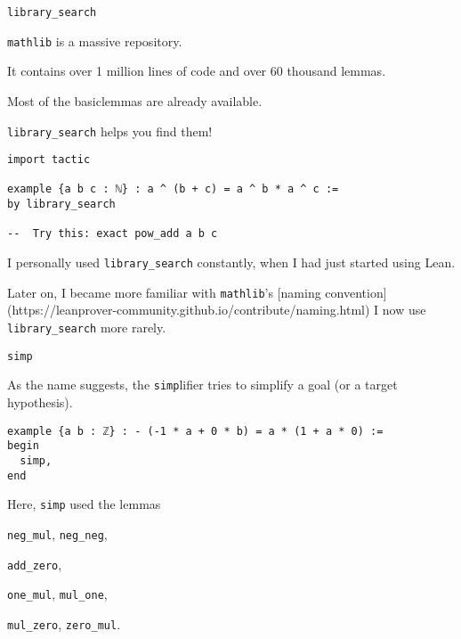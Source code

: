 \documentclass{beamer}
\begin{document}
\begin{frame}[fragile]{{\texttt{library\_search}}}

{\verb`mathlib`} is a massive repository.

It contains over 1 million lines of code and over 60 thousand lemmas.

Most of the basic\footnotemark lemmas are already available.

{\verb`library_search`} helps you find them!

\begin{verbatim}
import tactic

example {a b c : ℕ} : a ^ (b + c) = a ^ b * a ^ c :=
by library_search

--  Try this: exact pow_add a b c
\end{verbatim}

\end{frame}

\begin{frame}[fragile]

I personally used {\verb`library_search`} constantly, when I had just started using Lean.

Later on, I became more familiar with {\verb`mathlib`}'s [naming convention](https://leanprover-community.github.io/contribute/naming.html) I now use {\verb`library_search`} more rarely.
\end{frame}

\begin{frame}[fragile]{{\texttt{simp}}}

As the name suggests, the {\verb`simp`}lifier tries to simplify a goal (or a target hypothesis).

\begin{verbatim}
example {a b : ℤ} : - (-1 * a + 0 * b) = a * (1 + a * 0) :=
begin
  simp,
end
\end{verbatim}
Here, {\verb`simp`} used the lemmas

{\verb`neg_mul`}, {\verb`neg_neg`},

{\verb`add_zero`},

{\verb`one_mul`}, {\verb`mul_one`},

{\verb`mul_zero`}, {\verb`zero_mul`}.
\end{frame}
\end{document}
